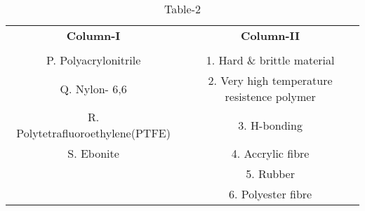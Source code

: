 
\begin{table}[htbp]
  \centering
  \caption{Table-2}
  \label{table2}
  \begin{tabular}{cc}
  \textbf{Column-I} & \textbf{Column-II} \\ \\
    P. Polyacrylonitrile & 1. Hard \& brittle material \\
    Q. Nylon- 6,6 & 2. Very high temperature resistence polymer \\
    R. Polytetrafluoroethylene(PTFE) & 3. H-bonding \\
    S. Ebonite & 4. Accrylic fibre \\
     & 5. Rubber \\
     & 6. Polyester fibre
  \end{tabular}
\end{table}





